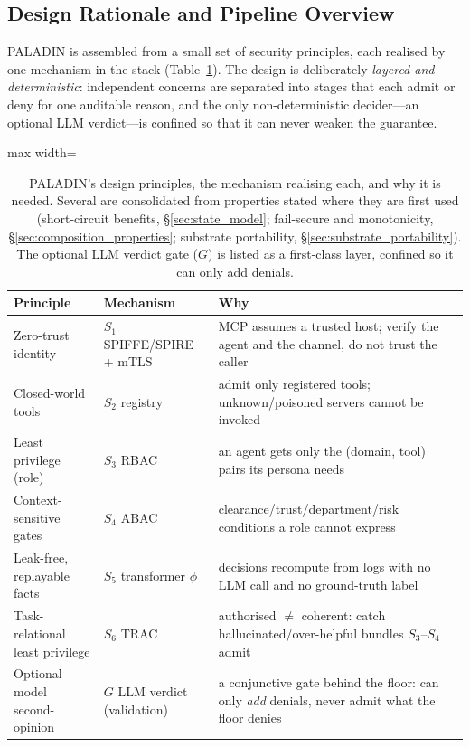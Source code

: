 \documentclass[sigconf,review,anonymous]{acmart}
\begin{document}
\subsection{Design Rationale and Pipeline Overview}
\label{sec:design_rationale}
\label{sec:pipeline_overview}

PALADIN is assembled from a small set of security principles, each realised by one mechanism in the stack (Table~\ref{tab:rationale}). The design is deliberately \emph{layered and deterministic}: independent concerns are separated into stages that each admit or deny for one auditable reason, and the only non-deterministic decider---an optional LLM verdict---is confined so that it can never weaken the guarantee.

\begin{table}[!t]
\centering
\caption{PALADIN's design principles, the mechanism realising each, and why it is needed. Several are consolidated from properties stated where they are first used (short-circuit benefits, \S\ref{sec:state_model}; fail-secure and monotonicity, \S\ref{sec:composition_properties}; substrate portability, \S\ref{sec:substrate_portability}). The optional LLM verdict gate ($G$) is listed as a first-class layer, confined so it can only add denials.}
\label{tab:rationale}
\footnotesize
\begin{adjustbox}{max width=\columnwidth}
\begin{tabular}{@{}lll@{}}
\toprule
\textbf{Principle} & \textbf{Mechanism} & \textbf{Why} \\
\midrule
Zero-trust identity & $S_1$ SPIFFE/SPIRE + mTLS & MCP assumes a trusted host; verify the agent and the channel, do not trust the caller \\
Closed-world tools & $S_2$ registry & admit only registered tools; unknown/poisoned servers cannot be invoked \\
Least privilege (role) & $S_3$ RBAC & an agent gets only the (domain, tool) pairs its persona needs \\
Context-sensitive gates & $S_4$ ABAC & clearance/trust/department/risk conditions a role cannot express \\
Leak-free, replayable facts & $S_5$ transformer $\phi$ & decisions recompute from logs with no LLM call and no ground-truth label \\
Task-relational least privilege & $S_6$ TRAC & authorised $\neq$ coherent: catch hallucinated/over-helpful bundles $S_3$--$S_4$ admit \\
Optional model second-opinion & $G$ LLM verdict (validation) & a conjunctive gate behind the floor: can only \emph{add} denials, never admit what the floor denies \\

\end{tabular}
\end{adjustbox}
\end{table}
\end{document}
